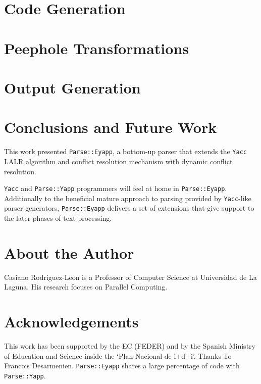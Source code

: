 \documentclass[times, 10pt,%
]{article}
\newcommand{\code}[1]{{\tt #1}}
\begin{document}
\section{Code Generation}
\label{section:codegeneration}


\section{Peephole Transformations}
\label{section:peephole}


\section{Output Generation}
\label{section:output}



\section{Conclusions and Future Work}

This work presented \code{Parse::Eyapp}, a bottom-up parser that 
extends the \code{Yacc} LALR algorithm and conflict resolution mechanism
with dynamic conflict resolution.

\code{Yacc} and \code{Parse::Yapp} programmers will feel at home
in \code{Parse::Eyapp}. 
Additionally to the beneficial mature approach to parsing provided by
\code{Yacc}-like parser generators,
\code{Parse::Eyapp} delivers a set of extensions
that give support to the later phases
of text processing.

\section{About the Author}
Casiano Rodriguez-Leon is a Professor of Computer Science at Universidad
de La Laguna. His research focuses on Parallel Computing. 


\section{Acknowledgements}

This work has been supported by the {\sc EC (FEDER)} and by
the Spanish Ministry of Education and Science inside the
`Plan Nacional de {\sc i+d+}i'.
Thanks To Francois Desarmenien. \code{Parse::Eyapp} shares a large percentage 
of code with \code{Parse::Yapp}.





\label{end:of:file}
\end{document}
